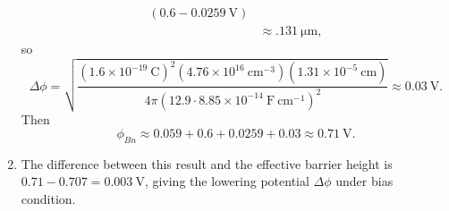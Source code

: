 \documentclass{article}
\begin{document}
\begin{enumerate}
{\begin{align*}
{                           (0.6 - 0.0259 ~\mathrm{V})} \\
             &\approx .131 ~\mathrm{\mu m},
       \end{align*}
       so
       $$
       \Delta \phi = \sqrt{\frac{(1.6 \times 10^{-19} ~\mathrm{C})^2 
                                 (4.76 \times 10^{16} ~\mathrm{cm}^{-3})
                                 (1.31 \times 10^{-5}  ~\mathrm{cm})}
                                {4 \pi (12.9 \cdot 8.85 \times 10^{-14} ~\mathrm{F}~\mathrm{cm}^{-1})^2}} \approx 0.03 ~\mathrm{V}.
       $$
       Then 
       $$
       \phi_{Bn} \approx 0.059 + 0.6 + 0.0259 + 0.03 \approx 0.71 ~\mathrm{V}.
       $$
   }
   \item{The difference between this result and the effective barrier height 
         is $0.71 - 0.707 = 0.003 ~\mathrm{V}$, giving the lowering potential 
         $\Delta \phi$ under bias condition.
        }
\end{enumerate}
\end{document}
